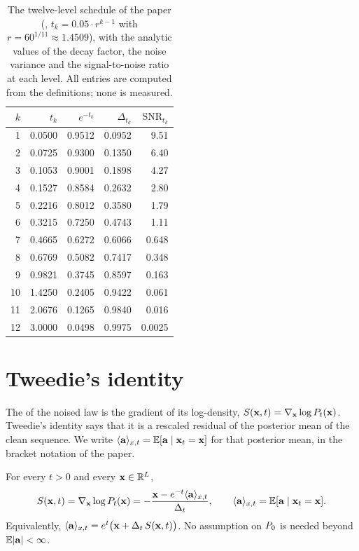 \begin{table}[t]
\centering
\caption{The twelve-level schedule of the paper (,
$t_k=0.05\cdot r^{k-1}$ with $r=60^{1/11}\approx1.4509$), with the analytic values of the
decay factor, the noise variance and the signal-to-noise ratio at each level. All
entries are computed from the definitions; none is measured.}
\label{tab:ou:levels}
\begin{tabular}{@{}rrrrr@{}}
\toprule
$k$ & $t_k$ & $e^{-t_k}$ & $\Delta_{t_k}$ & $\mathrm{SNR}_{t_k}$ \\
\midrule
1  & 0.0500 & 0.9512 & 0.0952 & 9.51 \\
2  & 0.0725 & 0.9300 & 0.1350 & 6.40 \\
3  & 0.1053 & 0.9001 & 0.1898 & 4.27 \\
4  & 0.1527 & 0.8584 & 0.2632 & 2.80 \\
5  & 0.2216 & 0.8012 & 0.3580 & 1.79 \\
6  & 0.3215 & 0.7250 & 0.4743 & 1.11 \\
7  & 0.4665 & 0.6272 & 0.6066 & 0.648 \\
8  & 0.6769 & 0.5082 & 0.7417 & 0.348 \\
9  & 0.9821 & 0.3745 & 0.8597 & 0.163 \\
10 & 1.4250 & 0.2405 & 0.9422 & 0.061 \\
11 & 2.0676 & 0.1265 & 0.9840 & 0.016 \\
12 & 3.0000 & 0.0498 & 0.9975 & 0.0025 \\
\bottomrule
\end{tabular}
\end{table}

\section{Tweedie's identity}
\label{sec:ou:tweedie}

The  of the noised law is the gradient of its log-density,
$S(\mathbf{x},t)=\nabla_{\mathbf{x}}\log P_t(\mathbf{x})$. Tweedie's identity says that it is a
rescaled residual of the posterior mean of the clean sequence. We write
$\langle \mathbf{a} \rangle_{x,t}=\mathbb{E}[\mathbf{a}\mid\mathbf{x}_t=\mathbf{x}]$ for that posterior mean, in the bracket notation of
the paper.

\begin{theorem}
\label{thm:ou:tweedie}
For every $t>0$ and every $\mathbf{x}\in\mathbb{R}^{L}$,
\begin{equation}
  S(\mathbf{x},t)=\nabla_{\mathbf{x}}\log P_t(\mathbf{x})=-\frac{\mathbf{x}-e^{-t}\langle \mathbf{a} \rangle_{x,t}}{\Delta_t},
  \qquad \langle \mathbf{a} \rangle_{x,t}=\mathbb{E}[\mathbf{a}\mid\mathbf{x}_t=\mathbf{x}].
  \label{eq:ou:tweedie}
\end{equation}
Equivalently, $\langle \mathbf{a} \rangle_{x,t}=e^{t}\bigl(\mathbf{x}+\Delta_t\,S(\mathbf{x},t)\bigr)$. No assumption on
$P_0$ is needed beyond $\mathbb{E}|\mathbf{a}|<\infty$.
\end{theorem}

